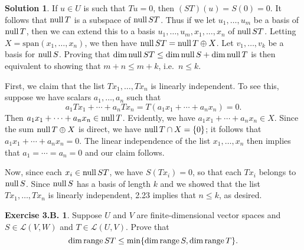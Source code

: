 \documentclass[12pt]{article}
\theoremstyle{definition}
\theoremstyle{exercise}
\newtheorem{exercise}{Exercise 3.B.}
\theoremstyle{solution}
\newtheorem*{solution}{Solution}
\newcommand{\lmap}{\mathcal{L}}
\newcommand{\Span}{\text{span}}
\newcommand{\Null}{\text{null\,}}
\newcommand{\Range}{\text{range\,}}
\begin{document}
\begin{solution}
    If \( u \in U \) is such that \( Tu = 0 \), then \( (ST)(u) = S(0) = 0 \). It follows that \( \Null T \) is a subspace of \( \Null ST \). Thus if we let \( u_1, \ldots, u_m \) be a basis of \( \Null T \), then we can extend this to a basis \( u_1, \ldots, u_m, x_1, \ldots, x_n \) of \( \Null ST \). Letting \( X = \Span(x_1, \ldots, x_n) \), we then have \( \Null ST = \Null T \oplus X \). Let \( v_1, \ldots, v_k \) be a basis for \( \Null S \). Proving that \( \dim \Null ST \leq \dim \Null S + \dim \Null T \) is then equivalent to showing that \( m + n \leq m + k \), i.e.\ \( n \leq k \).
    
    First, we claim that the list \( Tx_1, \ldots, Tx_n \) is linearly independent. To see this, suppose we have scalars \( a_1, \ldots, a_n \) such that
    \[
        a_1 Tx_1 + \cdots + a_n Tx_n = T(a_1 x_1 + \cdots + a_n x_n) = 0.
    \]
    Then \( a_1 x_1 + \cdots + a_n x_n \in \Null T \). Evidently, we have \( a_1 x_1 + \cdots + a_n x_n \in X \). Since the sum \( \Null T \oplus X \) is direct, we have \( \Null T \cap X = \{ 0 \} \); it follows that \( a_1 x_1 + \cdots + a_n x_n = 0 \). The linear independence of the list \( x_1, \ldots, x_n \) then implies that \( a_1 = \cdots = a_n = 0 \) and our claim follows.

    Now, since each \( x_i \in \Null ST \), we have \( S(Tx_i) = 0 \), so that each \( Tx_i \) belongs to \( \Null S \). Since \( \Null S \) has a basis of length \( k \) and we showed that the list \( Tx_1, \ldots, Tx_n \) is linearly independent, 2.23 implies that \( n \leq k \), as desired.
\end{solution}

\begin{exercise}
\label{ex:23}
    Suppose \( U \) and \( V \) are finite-dimensional vector spaces and \( S \in \lmap(V, W) \) and \( T \in \lmap(U, V) \). Prove that
    \[
        \dim \Range ST \leq \min \{ \dim \Range S, \dim \Range T \}.
    \]
\end{exercise}
\end{document}
